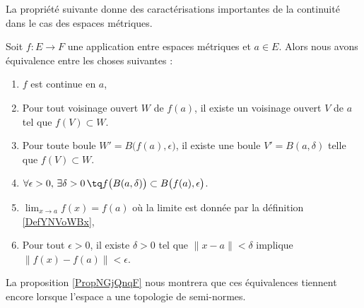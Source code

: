 La propriété suivante donne des caractérisations importantes de la continuité dans le cas des espaces métriques.
\begin{proposition} \label{PropQZRNpMn}
    Soit \( f\colon E\to F\) une application entre espaces métriques et \( a\in E\). Alors nous avons équivalence entre les choses suivantes :
    \begin{enumerate}
        \item\label{ItemCBUoRWJi}
            \( f\) est continue en \( a\),
        \item\label{ItemCBUoRWJii}
            Pour tout voisinage ouvert \( W\) de \( f(a)\), il existe un voisinage ouvert \( V\) de \( a\) tel que \( f(V)\subset W\).
        \item\label{ItemCBUoRWJiii}
            Pour toute boule \( W'=B\big( f(a),\epsilon \big)\), il existe une boule \( V'=B(a,\delta)\) telle que \( f(V)\subset W\).
        \item\label{ItemCBUoRWJiv}
            $\forall \epsilon>0,\,\exists \delta>0\,\tq f\big( B(a,\delta) \big)\subset B\big( f(a),\epsilon \big)$.
        \item\label{ItemYNQpikrii}
            \( \lim_{x\to a}f(x)=f(a)\) où la limite est donnée par la définition \ref{DefYNVoWBx},
        \item\label{ItemYNQpikriii}
            Pour tout \( \epsilon>0\), il existe \( \delta>0\) tel que \( \| x-a \|<\delta\) implique \( \| f(x)-f(a) \|<\epsilon\).
    \end{enumerate}
\end{proposition}
La proposition \ref{PropNGjQnqF} nous montrera que ces équivalences tiennent encore lorsque l'espace a une topologie de semi-normes.

